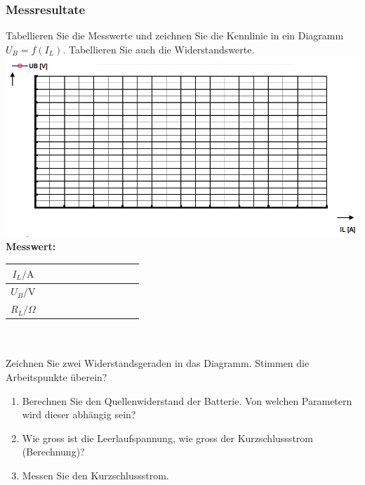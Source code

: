 \subsubsection{Messresultate}
Tabellieren Sie die Messwerte und zeichnen Sie die Kennlinie in ein Diagramm $U_B = f(I_L)$. Tabellieren Sie auch die Widerstandswerte.
\includegraphics[scale=0.5]{../img/III/IIIh}
\\
\textbf{Messwert:}\\
\begin{tabular}{|c|c|c|c|c|c|c|c|c|c|c|}\hline
$I_L/\text{A}$&&&&&&&&&&\\\hline
$U_B/\text{V}$&&&&&&&&&&\\\hline
$R_L/\Omega$&&&&&&&&&&\\\hline
\end{tabular}
\\\\
Zeichnen Sie zwei Widerstandsgeraden in das Diagramm. Stimmen die Arbeitspunkte überein?
\begin{enumerate}[$a)$]
\item Berechnen Sie den Quellenwiderstand der Batterie. Von welchen Parametern wird dieser abhängig sein?
\item Wie gross ist die Leerlaufspannung, wie gross der Kurzschlussstrom (Berechnung)?
\item Messen Sie den Kurzschlussstrom.
\end{enumerate}